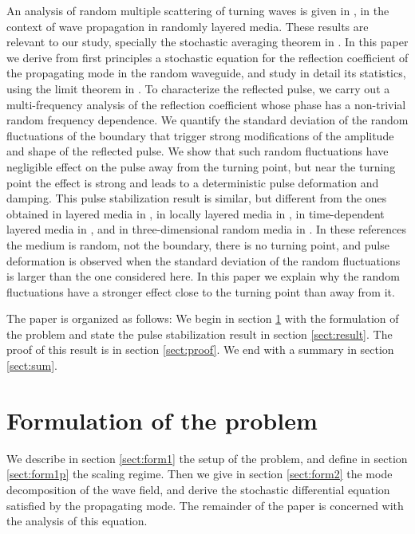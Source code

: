 \documentclass[final]{siamltex}
\begin{document}
An analysis of random multiple scattering of turning waves is given in
\cite{kim1996stochastic,kim1996uniform}, in the context of wave
propagation in randomly layered media.  These results are relevant to
our study, specially the stochastic averaging theorem in
\cite{kim1996uniform}. In this paper we derive from first principles a
stochastic equation for the reflection coefficient of the propagating
mode in the random waveguide, and study in detail its statistics,
using the limit theorem in \cite{kim1996uniform}. To characterize the
reflected pulse, we carry out a multi-frequency analysis of the
reflection coefficient whose phase has a non-trivial random frequency dependence.
We quantify the standard deviation of the random fluctuations of the boundary 
{that trigger strong modifications of the amplitude and shape  of the reflected pulse.}
We show that such random 
fluctuations  have negligible effect on the pulse away from the turning point, but  near the turning point the effect is 
strong and leads to a deterministic pulse deformation and damping.
This pulse stabilization result is similar, but different from the ones
obtained in layered media in \cite{o1971reflections,clouet1994spreading,
  lewicki1994pulse,lewicki1994long}, in locally layered media in
\cite{solna2000ray}, in time-dependent layered media in
\cite{borcea2016pulse}, and in three-dimensional random media in
\cite{garnier2012coupled}. In these references the medium is random, not the boundary,
there is no turning point, and pulse deformation is observed when
 the standard deviation of the random fluctuations 
is larger than the one considered here. In this paper we explain why the random fluctuations have a stronger effect
close to the turning point than away from it.

The paper is organized as follows: We begin in section
\ref{sect:formulation} with the formulation of the problem and state
the pulse stabilization result in section \ref{sect:result}. The proof
of this result is in section \ref{sect:proof}.  We end with a summary
in section \ref{sect:sum}.
\section{Formulation of the problem}
\label{sect:formulation}
We describe in section \ref{sect:form1} the setup of the problem, and
define in section \ref{sect:form1p} the scaling regime. Then we give
in section \ref{sect:form2} the mode decomposition of the wave field,
and derive the stochastic differential equation satisfied by the
propagating mode. The remainder of the
paper is concerned with the analysis of this equation.
\end{document}
